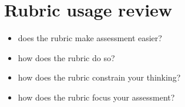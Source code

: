 \section{Rubric usage review} \label{rubReview}

\begin{itemize}
	\item does the rubric make assessment easier?
	\item how does the rubric do so?
	\item how does the rubric constrain your thinking?
	\item how does the rubric focus your assessment?
\end{itemize}
